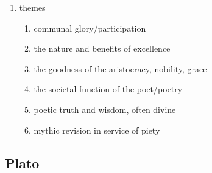 \documentclass[12pt]{article}
\begin{document}
\begin{enumerate}
    \begin{enumerate}
    \item wrote in a literary Doric, rather than his native dialect (common for this genre)
    \item a relatively rolling/free style, compared to Callimachus
    \item a loose and complicated relationship to meter, usually
    \item a loose structure: some kind of intro for the victor and usually in media res, usually uses gnomic (proverbial statements as transitions, some kind of myth retelling, abrupt beginnings/endings
    \item Pindar potentially wrote his own music and choreography
    \end{enumerate}
\item themes
    \begin{enumerate}
    \item communal glory/participation
    \item the nature and benefits of excellence
    \item the goodness of the aristocracy, nobility, grace
    \item the societal function of the poet/poetry
    \item poetic truth and wisdom, often divine
    \item mythic revision in service of piety
    \end{enumerate}
\end{enumerate}

\subsection{Plato}
\end{document}
